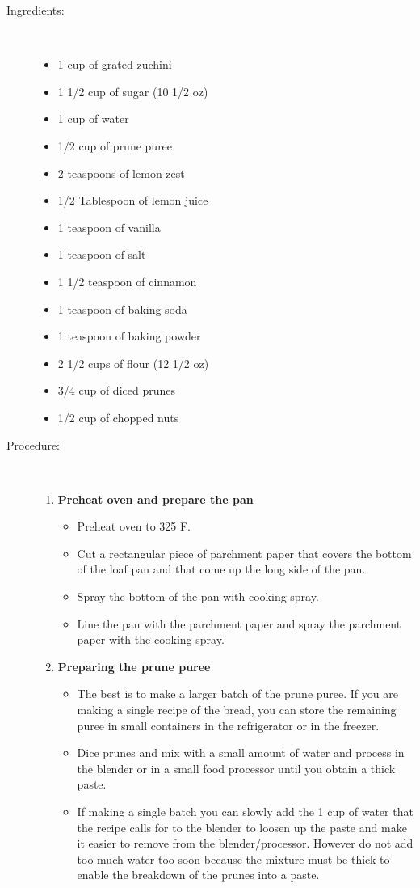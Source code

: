 \documentclass[11pt,letterpaper]{article}
\begin{document}
\begin{description}

\item[Ingredients:]\ \\
	\begin{itemize}
	\item	1 cup of grated zuchini
	\item 1 1/2 cup of sugar (10 1/2 oz)
	\item 1 cup of water
	\item 1/2 cup of prune puree
	\item 2 teaspoons of lemon zest
	\item 1/2 Tablespoon of lemon juice
	\item 1 teaspoon of vanilla
	\item 1 teaspoon of salt
	\item 1 1/2 teaspoon of cinnamon
	\item 1 teaspoon of baking soda
	\item 1 teaspoon of baking powder
	\item 2 1/2 cups of flour (12 1/2 oz)
	\item 3/4 cup of diced prunes
	\item 1/2 cup of chopped nuts
	\end{itemize}

\item[Procedure:]\ \\

	\begin{enumerate}
	\item {\bf Preheat oven and prepare the pan}
	\begin{itemize}
	\item Preheat oven to 325 F.
	\item Cut a rectangular piece of parchment paper that covers the bottom of the loaf pan and that come up the long side of the pan.
	\item Spray the bottom of the pan with cooking spray.
	\item Line the pan with the parchment paper and spray the parchment paper with the cooking spray.
	\end{itemize}
	
	\item {\bf Preparing the prune puree}
	\begin{itemize}
	\item The best is to make a larger batch of the prune puree. If you are making a single recipe of the bread, you can store the remaining puree in small containers in the refrigerator or in the freezer.
	\item Dice prunes and mix with a small amount of water and process in the blender or in a small food processor until you obtain a thick paste.
	\item If making a single batch you can slowly add the 1 cup of water that the recipe calls for to the blender to loosen up the paste and make it easier to remove from the blender/processor. However do not add too much water too soon because the mixture must be thick to enable the breakdown of the prunes into a paste.
	\end{itemize}


\end{enumerate}
\end{description}
\end{document}
